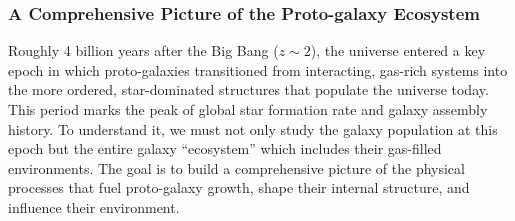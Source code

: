 \documentclass[oneside,11pt]{amsart}
\begin{document}



\subsubsection{A Comprehensive Picture of the Proto-galaxy Ecosystem}
\label{sec:galaxies}

Roughly 4 billion years after the Big Bang ($z \sim 2$), the universe
entered a key epoch in which proto-galaxies transitioned from
interacting, gas-rich systems into the more ordered, star-dominated
structures that populate the universe today.  This period marks the peak
of global star formation rate and galaxy assembly history.   To
understand it, we must not only study the galaxy population at this
epoch but the entire galaxy ``ecosystem'' which includes their
gas-filled environments.  The goal is to build a comprehensive picture
of the physical processes that fuel proto-galaxy growth, shape their
internal structure, and influence their environment.
\end{document}
